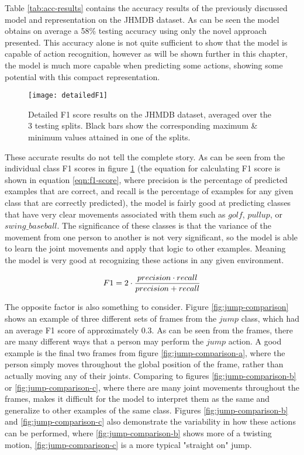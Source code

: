 Table \ref{tab:acc-results} contains the accuracy results of the previously discussed model and representation on the JHMDB dataset. As can be seen the model obtains on average a 58\% testing accuracy using only the novel approach presented. This accuracy alone is not quite sufficient to show that the model is capable of action recognition, however as will be shown further in this chapter, the model is much more capable when predicting some actions, showing some potential with this compact representation.

\begin{figure}[ht]
	\texttt{[image: detailedF1]}
	\centering
	\caption{Detailed F1 score results on the JHMDB dataset, averaged over the 3 testing splits. Black bars show the corresponding maximum \& minimum values attained in one of the splits.}
	\label{fig:detailed-f1}
\end{figure}

These accurate results do not tell the complete story. As can be seen from the individual class F1 scores in figure \ref{fig:detailed-f1} (the equation for calculating F1 score is shown in equation \ref{eqn:f1-score}, where precision is the percentage of predicted examples that are correct, and recall is the percentage of examples for any given class that are correctly predicted), the model is fairly good at predicting classes that have very clear movements associated with them such as $golf$, $pullup$, or $swing\_baseball$. The significance of these classes is that the variance of the movement from one person to another is not very significant, so the model is able to learn the joint movements and apply that logic to other examples. Meaning the model is very good at recognizing these actions in any given environment.

\begin{equation}
	\label{eqn:f1-score}
	\centering
	F1 = 2 \cdot \frac{precision \cdot recall}{precision + recall}
\end{equation}

The opposite factor is also something to consider. Figure \ref{fig:jump-comparison} shows an example of three different sets of frames from the $jump$ class, which had an average F1 score of approximately $0.3$. As can be seen from the frames, there are many different ways that a person may perform the $jump$ action. A good example is the final two frames from figure \ref{fig:jump-comparison-a}, where the person simply moves throughout the global position of the frame, rather than actually moving any of their joints. Comparing to figures \ref{fig:jump-comparison-b} or \ref{fig:jump-comparison-c}, where there are many joint movements throughout the frames, makes it difficult for the model to interpret them as the same and generalize to other examples of the same class. Figures \ref{fig:jump-comparison-b} and \ref{fig:jump-comparison-c} also demonstrate the variability in how these actions can be performed, where \ref{fig:jump-comparison-b} shows more of a twisting motion, \ref{fig:jump-comparison-c} is a more typical "straight on" jump.

